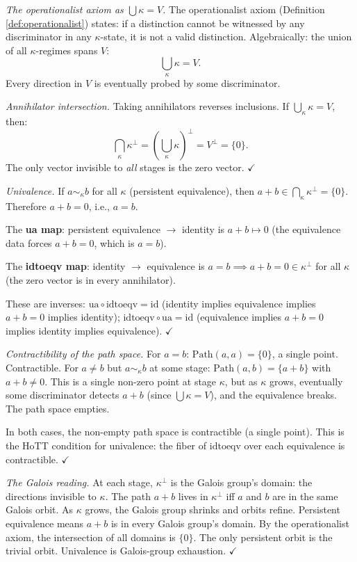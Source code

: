 \emph{The operationalist axiom as $\bigcup \kappa = V$.}
The operationalist axiom (Definition
\ref{def:operationalist}) states: if a distinction cannot
be witnessed by any discriminator in any $\kappa$-state,
it is not a valid distinction. Algebraically: the union
of all $\kappa$-regimes spans $V$:
\[
  \bigcup_\kappa \kappa = V.
\]
Every direction in $V$ is eventually probed by some
discriminator.

\emph{Annihilator intersection.}
Taking annihilators reverses inclusions. If
$\bigcup_\kappa \kappa = V$, then:
\[
  \bigcap_\kappa \kappa^\perp
  = \left(\bigcup_\kappa \kappa\right)^\perp
  = V^\perp = \{0\}.
\]
The only vector invisible to \emph{all} stages is the
zero vector. $\checkmark$

\emph{Univalence.}
If $a \sim_\kappa b$ for all $\kappa$ (persistent
equivalence), then $a + b \in \bigcap_\kappa
\kappa^\perp = \{0\}$. Therefore $a + b = 0$, i.e.,
$a = b$.

The \textbf{ua map}: persistent equivalence $\to$
identity is $a + b \mapsto 0$ (the equivalence data
forces $a + b = 0$, which is $a = b$).

The \textbf{idtoeqv map}: identity $\to$ equivalence
is $a = b \implies a + b = 0 \in \kappa^\perp$
for all $\kappa$ (the zero vector is in every
annihilator).

These are inverses:
$\mathrm{ua} \circ \mathrm{idtoeqv} = \mathrm{id}$
(identity implies equivalence implies $a + b = 0$
implies identity);
$\mathrm{idtoeqv} \circ \mathrm{ua} = \mathrm{id}$
(equivalence implies $a + b = 0$ implies identity
implies equivalence).
$\checkmark$

\emph{Contractibility of the path space.}
For $a = b$: $\mathrm{Path}(a, a) = \{0\}$, a single
point. Contractible.
For $a \neq b$ but $a \sim_\kappa b$ at some stage:
$\mathrm{Path}(a, b) = \{a + b\}$ with $a + b \neq 0$.
This is a single non-zero point at stage $\kappa$, but
as $\kappa$ grows, eventually some discriminator detects
$a + b$ (since $\bigcup \kappa = V$), and the equivalence
breaks. The path space empties.

In both cases, the non-empty path space is contractible
(a single point). This is the HoTT condition for
univalence: the fiber of $\mathrm{idtoeqv}$ over each
equivalence is contractible. $\checkmark$

\emph{The Galois reading.}
At each stage, $\kappa^\perp$ is the Galois group's
domain: the directions invisible to $\kappa$. The path
$a + b$ lives in $\kappa^\perp$ iff $a$ and $b$ are in
the same Galois orbit. As $\kappa$ grows, the Galois
group shrinks and orbits refine. Persistent equivalence
means $a + b$ is in every Galois group's domain. By
the operationalist axiom, the intersection of all
domains is $\{0\}$. The only persistent orbit is the
trivial orbit. Univalence is Galois-group exhaustion.
$\checkmark$


